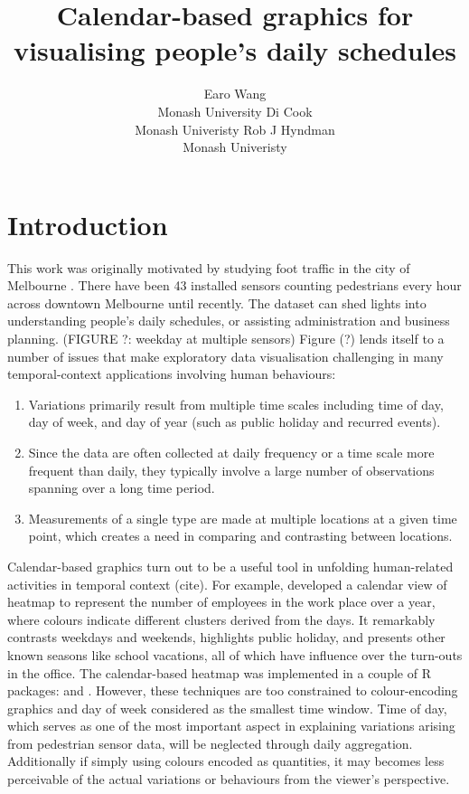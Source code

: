 \documentclass[article]{jss}
\author{
Earo Wang\\Monash University \And Di Cook\\Monash Univeristy \And Rob J Hyndman\\Monash Univeristy
}
\title{Calendar-based graphics for visualising people's daily schedules}
\providecommand{\tightlist}{%
  \setlength{\itemsep}{0pt}\setlength{\parskip}{0pt}}
\begin{document}
\section{Introduction}\label{introduction}

This work was originally motivated by studying foot traffic in the city
of Melbourne \citep{ped}. There have been 43 installed sensors counting
pedestrians every hour across downtown Melbourne until recently. The
dataset can shed lights into understanding people's daily schedules, or
assisting administration and business planning. (FIGURE ?: weekday at
multiple sensors) Figure (?) lends itself to a number of issues that
make exploratory data visualisation challenging in many temporal-context
applications involving human behaviours:

\begin{enumerate}
\def\labelenumi{\arabic{enumi}.}
\tightlist
\item
  Variations primarily result from multiple time scales including time
  of day, day of week, and day of year (such as public holiday and
  recurred events).
\item
  Since the data are often collected at daily frequency or a time scale
  more frequent than daily, they typically involve a large number of
  observations spanning over a long time period.
\item
  Measurements of a single type are made at multiple locations at a
  given time point, which creates a need in comparing and contrasting
  between locations.
\end{enumerate}

Calendar-based graphics turn out to be a useful tool in unfolding
human-related activities in temporal context (cite). For example,
\citet{VanWijkCluster1999} developed a calendar view of heatmap to
represent the number of employees in the work place over a year, where
colours indicate different clusters derived from the days. It remarkably
contrasts weekdays and weekends, highlights public holiday, and presents
other known seasons like school vacations, all of which have influence
over the turn-outs in the office. The calendar-based heatmap was
implemented in a couple of R packages: 
\citep{R-ggTimeSeries} and  \citep{R-ggcal}. However, these
techniques are too constrained to colour-encoding graphics and day of
week considered as the smallest time window. Time of day, which serves
as one of the most important aspect in explaining variations arising
from pedestrian sensor data, will be neglected through daily
aggregation. Additionally if simply using colours encoded as quantities,
it may becomes less perceivable of the actual variations or behaviours
from the viewer's perspective.
\end{document}
